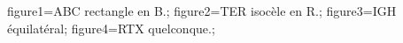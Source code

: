 \documentclass[exercice]{thedocument}%
\begin{document}
%
    \>figure1=ABC rectangle en B.;%
    \>figure2=TER isocèle en R.;%
    \>figure3=IGH équilatéral;%
    \>figure4=RTX quelconque.;%
\end{document}

